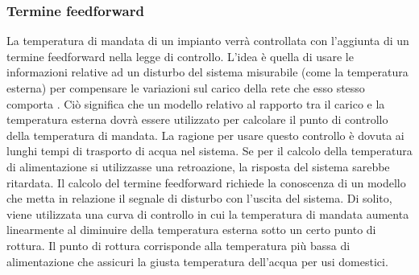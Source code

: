 \documentclass[laurea,oneside,11pt]{USiena_tesiLM3}
\begin{document}
\subsubsection{Termine feedforward}
La temperatura di mandata di un impianto verrà controllata con l'aggiunta di un termine feedforward nella legge di controllo. L'idea è quella di usare le informazioni relative ad un disturbo del sistema misurabile (come la temperatura esterna) per compensare le variazioni sul carico della rete che esso stesso comporta \cite{arvastson2001stochastic}. Ciò significa che un modello relativo al rapporto tra il carico e la temperatura esterna dovrà essere utilizzato per calcolare il punto di controllo della temperatura di mandata.
La ragione per usare questo controllo è dovuta ai lunghi tempi di trasporto di acqua nel sistema. Se per il calcolo della temperatura di alimentazione si utilizzasse una retroazione, la risposta del sistema sarebbe ritardata.
Il calcolo del termine feedforward richiede la conoscenza di un modello che metta in relazione  il segnale di disturbo con l'uscita del sistema. Di solito, viene utilizzata una curva di controllo in cui la temperatura di mandata aumenta linearmente al diminuire della temperatura esterna sotto un certo punto di rottura. Il punto di rottura corrisponde alla temperatura più bassa di alimentazione che assicuri la giusta temperatura dell'acqua per usi domestici. 
\end{document}
